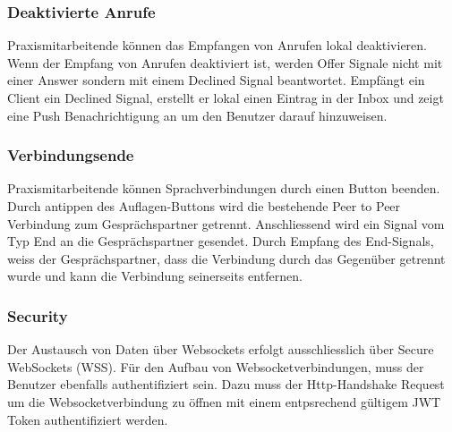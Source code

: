 \subsubsection{Deaktivierte Anrufe}

Praxismitarbeitende können das Empfangen von Anrufen lokal deaktivieren.
Wenn der Empfang von Anrufen deaktiviert ist, werden Offer Signale nicht mit einer Answer sondern mit einem Declined Signal beantwortet.
Empfängt ein Client ein Declined Signal, erstellt er lokal einen Eintrag in der Inbox und zeigt eine Push Benachrichtigung an um den Benutzer darauf hinzuweisen.

\subsubsection{Verbindungsende}

Praxismitarbeitende können Sprachverbindungen durch einen Button beenden.
Durch antippen des Auflagen-Buttons wird die bestehende Peer to Peer Verbindung zum Gesprächspartner getrennt.
Anschliessend wird ein Signal vom Typ End an die Gesprächspartner gesendet.
Durch Empfang des End-Signals, weiss der Gesprächspartner, dass die Verbindung durch das Gegenüber getrennt wurde und kann die Verbindung seinerseits entfernen.

\subsubsection{Security}

Der Austausch von Daten über Websockets erfolgt ausschliesslich über Secure WebSockets (WSS).
Für den Aufbau von Websocketverbindungen, muss der Benutzer ebenfalls authentifiziert sein.
Dazu muss der Http-Handshake Request um die Websocketverbindung zu öffnen mit einem entpsrechend gültigem JWT Token authentifiziert werden.


\clearpage
